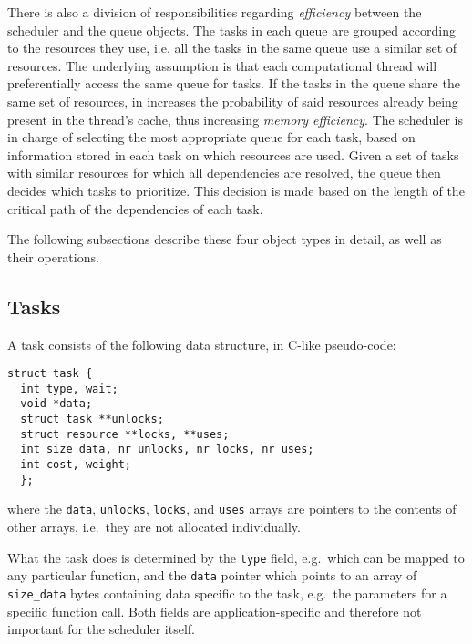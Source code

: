 \documentclass[preprint]{elsarticle}
\begin{document}
There is also a division of responsibilities regarding
{\em efficiency} between the scheduler and the queue
objects.
The tasks in each queue are grouped according to the resources
they use, i.e. all the tasks in the same queue use a
similar set of resources.
The underlying assumption is that each computational
thread will preferentially access the same queue for tasks.
If the tasks in the queue share the same set of resources,
in increases the probability of said resources already
being present in the thread's cache, thus increasing
{\em memory efficiency}.
The scheduler is in charge of selecting the most appropriate
queue for each task, based on information stored in each task
on which resources are used.
Given a set of tasks with similar resources for which all
dependencies are resolved, the queue then decides which
tasks to prioritize.
This decision is made based on the length of the critical
path of the dependencies of each task.

The following subsections describe these four object types
in detail, as well as their operations.


\subsection{Tasks}
\label{sec:tasks}

A task consists of the following data structure, in C-like pseudo-code:

\begin{center}\begin{minipage}{0.9\textwidth}
    \begin{lstlisting}
struct task {
  int type, wait;
  void *data;
  struct task **unlocks;
  struct resource **locks, **uses;
  int size_data, nr_unlocks, nr_locks, nr_uses;
  int cost, weight;
  };
    \end{lstlisting}
\end{minipage}\end{center}
\noindent where the {\tt data}, {\tt unlocks}, {\tt locks},
and {\tt uses} arrays are pointers to the contents of other
arrays, i.e.~they are not allocated individually.

What the task does is determined by the {\tt type}
field, e.g.~which can be mapped to any particular function,
and the {\tt data} pointer which points to an array of
{\tt size\_data} bytes containing data specific to the task,
e.g.~the parameters for a specific function call.
Both fields are application-specific and therefore not
important for the scheduler itself.
\end{document}
